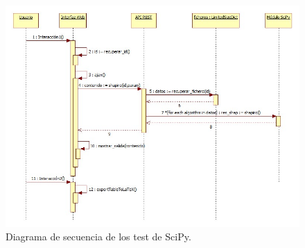 \begin{enumerate}
\begin{figure}[H]
\centering
\includegraphics[scale=0.5]{figuras/sec_scipy.jpg}
\caption{Diagrama de secuencia de los test de SciPy.}
\label{fig:sec_scipy}
\end{figure}

\end{enumerate}
